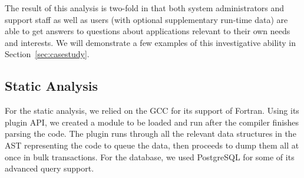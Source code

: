 The result of this analysis is two-fold in that both system administrators and support staff as well as users (with optional supplementary run-time data) are able to get answers to questions about applications relevant to their own needs and interests.
We will demonstrate a few examples of this investigative ability in Section~\ref{sec:casestudy}.

\subsection{Static Analysis}
For the static analysis, we relied on the \ac{GCC} for its support of Fortran.
Using its plugin \acs{API}, we created a module to be loaded and run after the compiler finishes parsing the code.
The plugin runs through all the relevant data structures in the \ac{AST} representing the code to queue the data, then proceeds to dump them all at once in bulk transactions.
For the database, we used PostgreSQL for some of its advanced query support.
